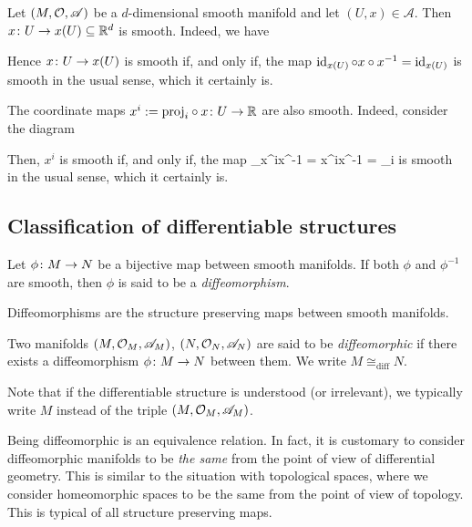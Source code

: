 \be
Let $(M,\mathcal{O},\mathscr{A})$ be a $d$-dimensional smooth manifold and let $(U,x)\in\mathscr{A}$. Then $x\colon U \to x(U)\subseteq \mathbb{R}^d$ is smooth. Indeed, we have
\bse
{}
\ese
Hence $x\colon U \to x(U)$ is smooth if, and only if, the map $\operatorname{id}_{x(U)}\circ x\circ x^{-1}=\operatorname{id}_{x(U)}$ is smooth in the usual sense, which it certainly is.

The coordinate maps $x^i:={\operatorname{proj}_i}\circ x\colon U \to \mathbb{R}$ are also smooth. Indeed, consider the diagram
\bse
{}
\ese
Then, $x^i$ is smooth if, and only if, the map
\bse
{\id_\R}\circ x^i\circ x^{-1} =  x^i\circ x^{-1} = \proj_i
\ese
is smooth in the usual sense, which it certainly is.
\ee

\subsection{Classification of differentiable structures}

\bd
Let $\phi\colon M \to N$ be a bijective map between smooth manifolds. If both $\phi$ and $\phi^{-1}$ are smooth, then $\phi$ is said to be a \emph{diffeomorphism}.
\ed

Diffeomorphisms are the structure preserving maps between smooth manifolds. 

\bd
Two manifolds $(M,\mathcal{O}_M,\mathscr{A}_M)$, $(N,\mathcal{O}_N,\mathscr{A}_N)$ are said to be \emph{diffeomorphic} if there exists a diffeomorphism $\phi\colon M\to N$ between them. We write $M \cong_\text{diff}N$.
\ed

Note that if the differentiable structure is understood (or irrelevant), we typically write $M$ instead of the triple $(M,\mathcal{O}_M,\mathscr{A}_M)$.

\br
Being diffeomorphic is an equivalence relation. In fact, it is customary to consider diffeomorphic manifolds to be \emph{the same} from the point of view of differential geometry. This is similar to the situation with topological spaces, where we consider homeomorphic spaces to be the same from the point of view of topology. This is typical of all structure preserving maps.
\er

